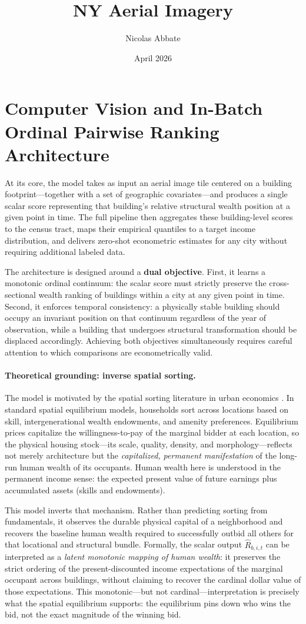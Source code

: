 \documentclass{article}
\title{NY Aerial Imagery}
\author{Nicolas Abbate}
\date{April 2026}
\begin{document}
\section{Computer Vision and In-Batch Ordinal Pairwise Ranking Architecture}

At its core, the model takes as input an aerial image tile centered on a building footprint---together with a set of geographic covariates---and produces a single scalar score representing that building's relative structural wealth position at a given point in time. The full pipeline then aggregates these building-level scores to the census tract, maps their empirical quantiles to a target income distribution, and delivers zero-shot econometric estimates for any city without requiring additional labeled data.

The architecture is designed around a \textbf{dual objective}. First, it learns a monotonic ordinal continuum: the scalar score must strictly preserve the cross-sectional wealth ranking of buildings within a city at any given point in time. Second, it enforces temporal consistency: a physically stable building should occupy an invariant position on that continuum regardless of the year of observation, while a building that undergoes structural transformation should be displaced accordingly. Achieving both objectives simultaneously requires careful attention to which comparisons are econometrically valid.

\paragraph{Theoretical grounding: inverse spatial sorting.}
The model is motivated by the spatial sorting literature in urban economics \citep{ahlfeldt2015economics, diamond2016determinants}. In standard spatial equilibrium models, households sort across locations based on skill, intergenerational wealth endowments, and amenity preferences. Equilibrium prices capitalize the willingness-to-pay of the marginal bidder at each location, so the physical housing stock---its scale, quality, density, and morphology---reflects not merely architecture but the \textit{capitalized, permanent manifestation} of the long-run human wealth of its occupants. Human wealth here is understood in the permanent income sense: the expected present value of future earnings plus accumulated assets (skills and endowments).

This model inverts that mechanism. Rather than predicting sorting from fundamentals, it observes the durable physical capital of a neighborhood and recovers the baseline human wealth required to successfully outbid all others for that locational and structural bundle. Formally, the scalar output $\hat{R}_{b,i,t}$ can be interpreted as a \textit{latent monotonic mapping of human wealth}: it preserves the strict ordering of the present-discounted income expectations of the marginal occupant across buildings, without claiming to recover the cardinal dollar value of those expectations. This monotonic---but not cardinal---interpretation is precisely what the spatial equilibrium supports: the equilibrium pins down who wins the bid, not the exact magnitude of the winning bid.
\end{document}
